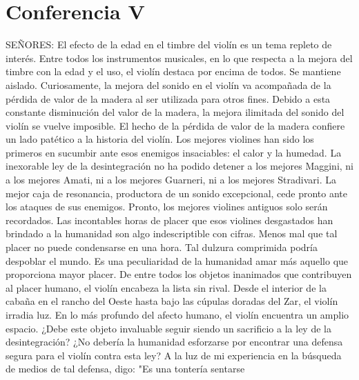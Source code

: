 \chapter*{Conferencia V}
SEÑORES: El efecto de la edad en el timbre del violín es un tema repleto de interés. Entre todos los instrumentos musicales, en lo que respecta a la mejora del timbre con la edad y el uso, el violín destaca por encima de todos.
Se mantiene aislado. Curiosamente, la mejora del sonido en el violín va acompañada de la pérdida de valor de la madera al ser utilizada para otros fines. Debido a esta constante disminución del valor de la madera, la mejora ilimitada del sonido del violín se vuelve imposible. El hecho de la pérdida de valor de la madera confiere un lado patético a la historia del violín. Los mejores violines han sido los primeros en sucumbir ante esos enemigos insaciables: el calor y la humedad. La inexorable ley de la desintegración no ha podido detener a los mejores Maggini, ni a los mejores Amati, ni a los mejores Guarneri, ni a los mejores Stradivari. La mejor caja de resonancia, productora de un sonido excepcional, cede pronto ante los ataques de sus enemigos. Pronto, los mejores violines antiguos solo serán recordados.
Las incontables horas de placer que esos violines desgastados han brindado a la humanidad son algo indescriptible con cifras. Menos mal que tal placer no puede condensarse en una hora. Tal dulzura comprimida podría despoblar el mundo. Es una peculiaridad de la humanidad amar más aquello que proporciona mayor placer. De entre todos los objetos inanimados que contribuyen al placer humano, el violín encabeza la lista sin rival. Desde el interior de la cabaña en el rancho del Oeste hasta bajo las cúpulas doradas del Zar, el violín irradia luz.
En lo más profundo del afecto humano, el violín encuentra un amplio espacio. ¿Debe este objeto invaluable seguir siendo un sacrificio a la ley de la desintegración? ¿No debería la humanidad esforzarse por encontrar una defensa segura para el violín contra esta ley?
A la luz de mi experiencia en la búsqueda de medios de tal defensa, digo: "Es una tontería sentarse
